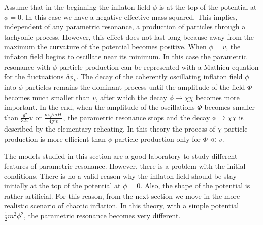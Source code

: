\documentclass[11pt,a4paper,twoside]{book}
\begin{document}
Assume that in the beginning the inflaton field $ \phi $ is at the top of the potential at $ \phi=0 $. In this case we have a negative effective mass squared. This implies, independent of any parametric resonance, a production of particles through a tachyonic process. However, this effect does not last long because away from the maximum the curvature of the potential becomes positive. When $ \phi = v $, the inflaton field begins to oscillate near its minimum. In this case the parametric resonance  with $ \phi $-particle production can be represented with a Mathieu equation  for the fluctuations $\delta \phi_{k}$. 
The decay of the coherently oscillating inflaton field $\phi$ into $\phi$-particles remains the dominant process until the amplitude of the field $\Phi$ becomes much smaller than $ v $, after which the decay $ \phi \rightarrow \chi \chi $ becomes more important. In the end, when the amplitude of the oscillations $ \Phi $ becomes smaller than $ \frac{g^{2}}{32\pi}v $  or   $ \frac{m\sqrt{mH}}{4g^{2}v} $, the parametric resonance stops and the decay $ \phi \rightarrow \chi \chi $ is described by the elementary reheating.
In this theory the process of $ \chi $-particle production is more efficient than $\phi$-particle production only for $ \Phi \ll v $.

The models studied in this section are a good laboratory to study different features of parametric resonance. However, there is a problem with the initial conditions. There is no a valid reason why the inflaton field should be stay initially at the top of the potential at $ \phi=0 $. Also, the shape of the potential is rather artificial. For this reason, from the next section we move in the more realistic scenario of chaotic inflation. In this theory, with a simple potential $ \frac{1}{2}m^{2}\phi^{2} $, the parametric resonance becomes very different.
\end{document}
